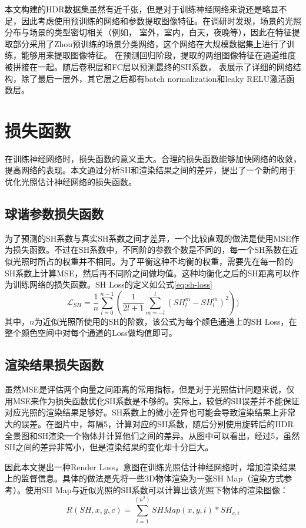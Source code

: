 本文构建的HDR数据集虽然有近千张，但是对于训练神经网络来说还是略显不足，因此考虑使用预训练的网络和参数提取图像特征。在调研时发现，场景的光照分布与场景的类型密切相关（例如， 室外，室内，白天，夜晚等），因此在特征提取部分采用了Zhou预训练的场景分类网络\cite{zhou2017places}，这个网络在大规模数据集上进行了训练，能够用来提取图像特征。 在预测回归阶段，提取的两组图像特征在通道维度被拼接在一起。随后卷积层和FC层以预测最终的SH系数， 表展示了详细的网络结构，除了最后一层外，其它层之后都有batch normalization和leaky RELU激活函数层。
\section{损失函数}
在训练神经网络时，损失函数的意义重大。合理的损失函数能够加快网络的收敛，提高网络的表现。本文通过分析SH和渲染结果之间的差异，提出了一个新的用于优化光照估计神经网络的损失函数。
\subsection{球谐参数损失函数} 为了预测的SH系数与真实SH系数之间才差异，一个比较直观的做法是使用MSE作为损失函数。不过在SH系数中，不同阶的参数个数是不同的，每一个SH系数在近似光照时所占的权重并不相同。为了平衡这种不均衡的权重，需要先在每一阶的SH系数上计算MSE，然后再不同阶之间做均值。这种均衡化之后的SH距离可以作为训练网络的损失函数。SH Loss的定义如公式\ref{eq:sh-loss}
\begin{equation}
    \mathcal{L}_{SH} = \frac{1}{n}\sum_{l=0}^{n-1}(\frac{1}{2l+1}\sum_{m=-l}^{l}(SH^m_l - SH^m_l)^2))
    \label{eq:sh-loss}
\end{equation}
其中，$n$为近似光照所使用的SH的阶数，该公式为每个颜色通道上的SH Loss，在整个颜色空间中对每个通道的Loss做均值即可。

\subsection{渲染结果损失函数} 虽然MSE是评估两个向量之间距离的常用指标，但是对于光照估计问题来说，仅用MSE来作为损失函数优化SH系数是不够的。实际上，较低的SH误差并不能保证对应光照的渲染结果足够好。SH系数上的微小差异也可能会导致渲染结果上非常大的误差。在图片中，每隔5，计算对应的SH系数，随后分别使用旋转后的HDR全景图和SH渲染一个物体并计算他们之间的差异。从图中可以看出，经过5，虽然SH之间的差异非常小，但是渲染结果的变化却十分巨大。

因此本文提出一种Render Loss，意图在训练光照估计神经网络时，增加渲染结果上的监督信息。具体的做法是先将一些3D物体渲染为一张SH Map（渲染方式参考\cite{green2003spherical}）。使用SH Map与近似光照的SH系数可以计算出该光照下物体的渲染图像：
\begin{equation}
    R(SH, x, y, c) = \sum^(n^2)_{i=1}SHMap(x,y,i)*SH_{c,i}
\end{equation}

